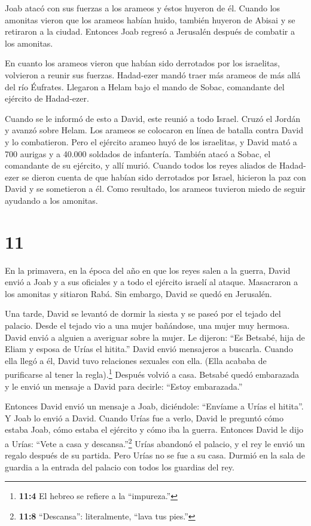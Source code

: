  Joab atacó con sus fuerzas a los arameos y éstos huyeron
de él.  Cuando los amonitas vieron que los arameos habían
huido, también huyeron de Abisai y se retiraron a la ciudad. Entonces
Joab regresó a Jerusalén después de combatir a los amonitas.

 En cuanto los arameos vieron que habían sido derrotados
por los israelitas, volvieron a reunir sus fuerzas. 
Hadad-ezer mandó traer más arameos de más allá del río Éufrates.
Llegaron a Helam bajo el mando de Sobac, comandante del ejército de
Hadad-ezer.

 Cuando se le informó de esto a David, este reunió a todo
Israel. Cruzó el Jordán y avanzó sobre Helam. Los arameos se colocaron
en línea de batalla contra David y lo combatieron.  Pero el
ejército arameo huyó de los israelitas, y David mató a 700 aurigas y a
40.000 soldados de infantería. También atacó a Sobac, el comandante de
su ejército, y allí murió.  Cuando todos los reyes aliados
de Hadad-ezer se dieron cuenta de que habían sido derrotados por Israel,
hicieron la paz con David y se sometieron a él. Como resultado, los
arameos tuvieron miedo de seguir ayudando a los amonitas.

\hypertarget{section-10}{%
\section{11}\label{section-10}}

 En la primavera, en la época del año en que los reyes salen
a la guerra, David envió a Joab y a sus oficiales y a todo el ejército
israelí al ataque. Masacraron a los amonitas y sitiaron Rabá. Sin
embargo, David se quedó en Jerusalén.

 Una tarde, David se levantó de dormir la siesta y se paseó
por el tejado del palacio. Desde el tejado vio a una mujer bañándose,
una mujer muy hermosa.  David envió a alguien a averiguar
sobre la mujer. Le dijeron: ``Es Betsabé, hija de Eliam y esposa de
Urías el hitita.''  David envió mensajeros a buscarla.
Cuando ella llegó a él, David tuvo relaciones sexuales con ella. (Ella
acababa de purificarse al tener la regla).\footnote{\textbf{11:4} El
  hebreo se refiere a la ``impureza.''} Después volvió a casa.
 Betsabé quedó embarazada y le envió un mensaje a David para
decirle: ``Estoy embarazada.''

 Entonces David envió un mensaje a Joab, diciéndole:
``Envíame a Urías el hitita''. Y Joab lo envió a David. 
Cuando Urías fue a verlo, David le preguntó cómo estaba Joab, cómo
estaba el ejército y cómo iba la guerra.  Entonces David le
dijo a Urías: ``Vete a casa y descansa.''\footnote{\textbf{11:8}
  ``Descansa'': literalmente, ``lava tus pies.''} Urías abandonó el
palacio, y el rey le envió un regalo después de su partida. 
Pero Urías no se fue a su casa. Durmió en la sala de guardia a la
entrada del palacio con todos los guardias del rey.

